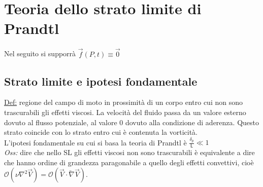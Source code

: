 \documentclass[11pt,a4paper]{report}
\begin{document}
{\let\clearpage\relax \chapter{Teoria dello strato limite di Prandtl}
Nel seguito si supporrà $\vec f(P,t)\equiv\vec 0$
	\section{Strato limite e ipotesi fondamentale} 	\label{def sl}
	\underline{Def:} regione del campo di moto in prossimità di un corpo entro cui non sono trascurabili gli effetti viscosi. La velocità del fluido passa da un valore esterno dovuto al flusso potenziale, al valore 0 dovuto alla condizione di aderenza. Questo strato coincide con lo strato entro cui è contenuta la vorticità.\\ L'ipotesi fondamentale su cui si basa la teoria di Prandtl è $\frac{\delta_p}{\mathsf L}\ll 1$\\
	\textit{Oss:} dire che nello SL gli effetti viscosi non sono trascurabili è equivalente a dire che hanno ordine di grandezza paragonabile a quello degli effetti convettivi, cioè $\mathcal O(\nu\nabla^2\vec V)=\mathcal O(\vec V\cdot\utilde\nabla\vec V)$.
	
}
\end{document}
